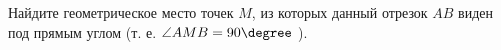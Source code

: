 \begin{ex}
	\begin{condition}
		Найдите геометрическое место точек \( M  \), из которых данный отрезок \( AB \) виден под прямым углом (т. е. \( \angle AMB = 90\degree \) ).
	\end{condition}
\end{ex}